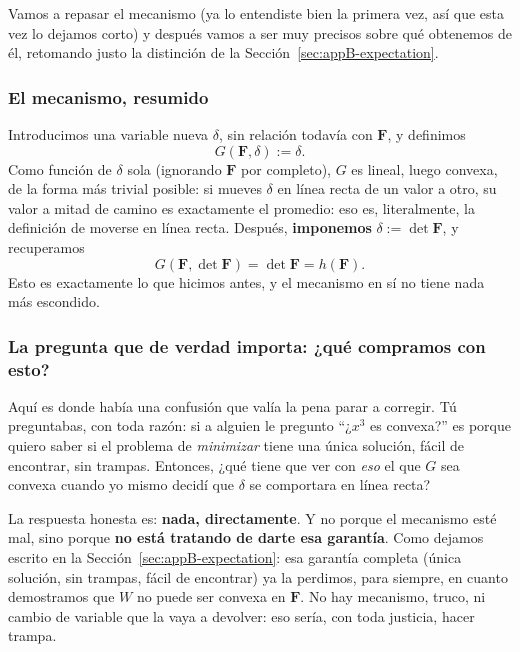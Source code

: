 \documentclass[11pt,a4paper]{article}
\begin{document}
Vamos a repasar el mecanismo (ya lo entendiste bien la primera vez,
as\'i que esta vez lo dejamos corto) y despu\'es vamos a ser muy
precisos sobre qu\'e obtenemos de \'el, retomando justo la distinci\'on
de la Secci\'on~\ref{sec:appB-expectation}.

\subsubsection*{El mecanismo, resumido}

Introducimos una variable nueva $\delta$, sin relaci\'on todav\'ia con
$\bm F$, y definimos
\[
 G(\bm F,\delta):=\delta.
\]
Como funci\'on de $\delta$ sola (ignorando $\bm F$ por completo), $G$
es lineal, luego convexa, de la forma m\'as trivial posible: si mueves
$\delta$ en l\'inea recta de un valor a otro, su valor a mitad de
camino es exactamente el promedio: eso es, literalmente, la
definici\'on de moverse en l\'inea recta. Despu\'es, \textbf{imponemos}
$\delta:=\det\bm F$, y recuperamos
\[
 G(\bm F,\det\bm F)=\det\bm F=h(\bm F).
\]
Esto es exactamente lo que hicimos antes, y el mecanismo en s\'i no
tiene nada m\'as escondido.

\subsubsection*{La pregunta que de verdad importa: ¿qu\'e compramos con esto?}

Aqu\'i es donde hab\'ia una confusi\'on que val\'ia la pena parar a
corregir. T\'u preguntabas, con toda raz\'on: si a alguien le
pregunto ``¿$x^3$ es convexa?'' es porque quiero saber si el problema
de \emph{minimizar} tiene una \'unica soluci\'on, f\'acil de encontrar,
sin trampas. Entonces, ¿qu\'e tiene que ver con \emph{eso} el que $G$
sea convexa cuando yo mismo decid\'i que $\delta$ se comportara en
l\'inea recta?

La respuesta honesta es: \textbf{nada, directamente}. Y no porque el
mecanismo est\'e mal, sino porque \textbf{no est\'a tratando de darte
esa garant\'ia}. Como dejamos escrito en la
Secci\'on~\ref{sec:appB-expectation}: esa garant\'ia completa (\'unica
soluci\'on, sin trampas, f\'acil de encontrar) ya la perdimos, para
siempre, en cuanto demostramos que $W$ no puede ser convexa en $\bm F$.
No hay mecanismo, truco, ni cambio de variable que la vaya a devolver:
eso ser\'ia, con toda justicia, hacer trampa.
\end{document}
